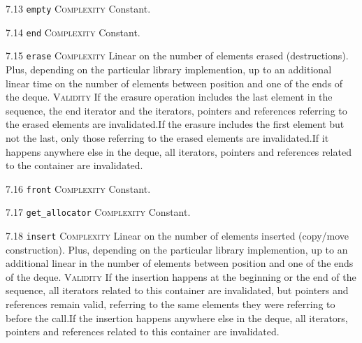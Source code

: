 \noindent\textcolor{cgreen}{7.13 \texttt{empty}} \textsc{Complexity} Constant. \vspace{0.5em}

\noindent\textcolor{cgreen}{7.14 \texttt{end}} \textsc{Complexity} Constant. \vspace{0.5em}

\noindent\textcolor{corange}{7.15 \texttt{erase}} \textsc{Complexity} Linear on the number of elements erased (destructions). Plus, depending on the particular library implemention, up to an additional linear time on the number of elements between position and one of the ends of the deque. \textsc{Validity} If the erasure operation includes the last element in the sequence, the end iterator and the iterators, pointers and references referring to the erased elements are invalidated.If the erasure includes the first element but not the last, only those referring to the erased elements are invalidated.If it happens anywhere else in the deque, all iterators, pointers and references related to the container are invalidated.\vspace{0.5em}

\noindent\textcolor{cgreen}{7.16 \texttt{front}} \textsc{Complexity} Constant. \vspace{0.5em}

\noindent\textcolor{cgreen}{7.17 \texttt{get\_allocator}} \textsc{Complexity} Constant. \vspace{0.5em}

\noindent\textcolor{corange}{7.18 \texttt{insert}} \textsc{Complexity} Linear on the number of elements inserted (copy/move construction). Plus, depending on the particular library implemention, up to an additional linear in the number of elements between position and one of the ends of the deque. \textsc{Validity} If the insertion happens at the beginning or the end of the sequence, all iterators related to this container are invalidated, but pointers and references remain valid, referring to the same elements they were referring to before the call.If the insertion happens anywhere else in the deque, all iterators, pointers and references related to this container are invalidated.\vspace{0.5em}

